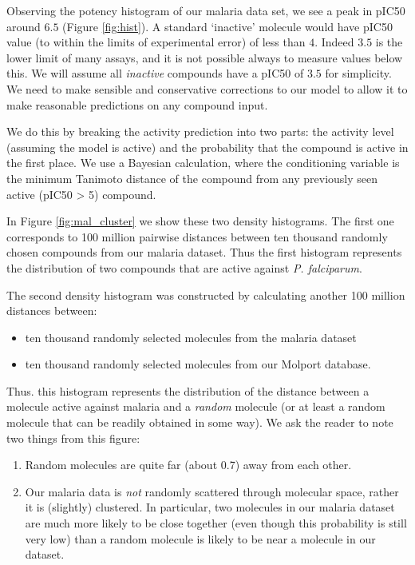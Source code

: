 \documentclass{article}
\begin{document}
Observing the potency histogram of our malaria data set, we see a peak in pIC50 around $6.5$ (Figure \ref{fig:hist}).  A standard `inactive' molecule would have pIC50 value (to within the limits of experimental error) of less than $4$.  Indeed $3.5$ is the lower limit of many assays, and it is not possible always to measure values below this.  We will assume all \textit{inactive} compounds have a pIC50 of $3.5$ for simplicity.
\newline
\newline
We need to make sensible and conservative corrections to our model to allow it to make reasonable predictions on any compound input.  

We do this by breaking the activity prediction into two parts: the activity level (assuming the model is active) and the probability that the compound is active in the first place.  We use a Bayesian calculation, where the conditioning variable is the minimum Tanimoto distance of the compound from any previously seen active (pIC50 > 5) compound.

In Figure \ref{fig:mal_cluster} we show these two density histograms. 
The first one corresponds to 100 million pairwise distances between ten thousand randomly chosen compounds from our malaria dataset.  Thus the first histogram represents the distribution of two compounds that are active against {\it P. falciparum}.

The second density histogram was constructed by calculating another 100 million distances between:
\begin{itemize}
    \item ten thousand randomly selected molecules from the malaria dataset
    \item ten thousand randomly selected molecules from our Molport database.
\end{itemize}
Thus. this histogram represents the distribution of the distance between a molecule active against malaria and a \textit{random} molecule (or at least a random molecule that can be readily obtained in some way).
\newline
\newline
We ask the reader to note two things from this figure:
\begin{enumerate}
    \item Random molecules are quite far (about 0.7) away from each other.
    \item Our malaria data is \textit{not} randomly scattered through molecular space, rather it is (slightly) clustered.  In particular, two molecules in our malaria dataset are much more likely to be close together (even though this probability is still very low) than a random molecule is likely to be near a molecule in our dataset.
\end{enumerate}
\end{document}

